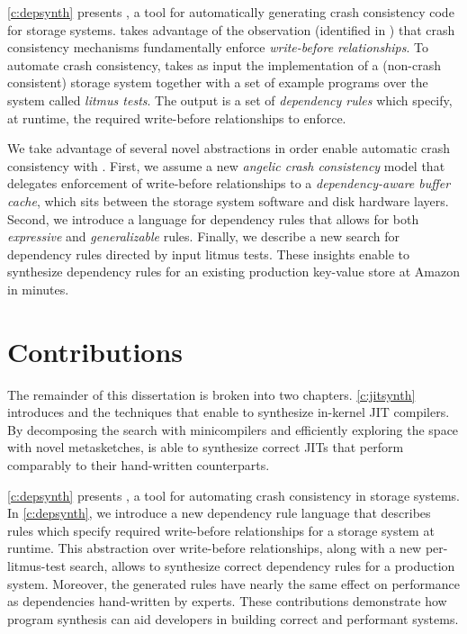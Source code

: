 \cref{c:depsynth} presents \depsynth, a tool for automatically generating crash consistency
code for storage systems.
\depsynth takes advantage of the observation
(identified in \cite{frost:featherstitch})
that crash consistency mechanisms fundamentally enforce \textit{write-before relationships}.
To automate crash consistency,
\depsynth takes as input the implementation of a (non-crash consistent) storage system together
with a set of example programs over the system called \textit{litmus tests}.
The output is a set of \textit{dependency rules} which specify, at runtime,
the required write-before relationships to enforce.

We take advantage of several novel abstractions in order enable
automatic crash consistency with \depsynth.
First, we assume a new \textit{angelic crash consistency} model
that delegates enforcement of write-before relationships to a
\textit{dependency-aware buffer cache},
which sits between the storage system software and disk hardware layers.
Second, we introduce a language for dependency rules
that allows for both \textit{expressive} and \textit{generalizable} rules.
Finally, we describe a new search for dependency rules
directed by input litmus tests.
These insights enable \depsynth to synthesize dependency rules for an existing
production key-value store at Amazon \cite{bornholt:s3} in \shardstoresynthesistime minutes.

\section{Contributions}
The remainder of this dissertation is broken into two chapters.
\cref{c:jitsynth} introduces \jitsynth and the techniques that enable
\jitsynth to synthesize in-kernel JIT compilers.
By decomposing the search with minicompilers
and efficiently exploring the space with novel metasketches,
\jitsynth is able to synthesize correct JITs that perform
comparably to their hand-written counterparts.

\cref{c:depsynth} presents \depsynth, a tool for automating
crash consistency in storage systems. In \cref{c:depsynth},
we introduce a new dependency rule language that describes rules
which specify required write-before relationships for a storage system
at runtime. This abstraction over write-before relationships, along
with a new per-litmus-test search, allows \depsynth to synthesize
correct dependency rules for a production system.
Moreover, the generated rules have nearly the same effect on performance
as dependencies hand-written by experts.
These contributions demonstrate
how program synthesis can aid developers in building
correct and performant systems.

